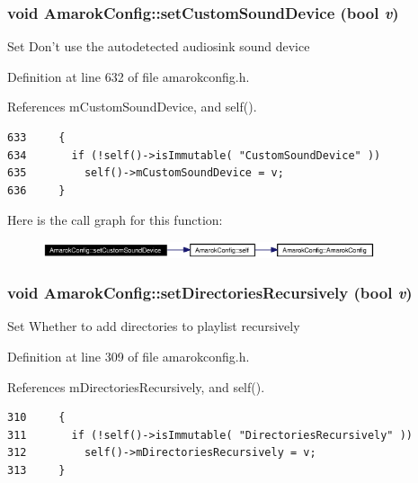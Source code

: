\subsubsection{\setlength{\rightskip}{0pt plus 5cm}void Amarok\-Config::set\-Custom\-Sound\-Device (bool {\em v})\hspace{0.3cm}{\tt  [inline, static]}}\label{classAmarokConfig_AmarokConfige65}


Set Don't use the autodetected audiosink sound device 

Definition at line 632 of file amarokconfig.h.

References m\-Custom\-Sound\-Device, and self().



\footnotesize\begin{verbatim}633     {
634       if (!self()->isImmutable( "CustomSoundDevice" ))
635         self()->mCustomSoundDevice = v;
636     }
\end{verbatim}\normalsize 


Here is the call graph for this function:\begin{figure}[H]
\begin{center}
\leavevmode
\includegraphics[width=277pt]{classAmarokConfig_AmarokConfige65_cgraph}
\end{center}
\end{figure}
\subsubsection{\setlength{\rightskip}{0pt plus 5cm}void Amarok\-Config::set\-Directories\-Recursively (bool {\em v})\hspace{0.3cm}{\tt  [inline, static]}}\label{classAmarokConfig_AmarokConfige31}


Set Whether to add directories to playlist recursively 

Definition at line 309 of file amarokconfig.h.

References m\-Directories\-Recursively, and self().



\footnotesize\begin{verbatim}310     {
311       if (!self()->isImmutable( "DirectoriesRecursively" ))
312         self()->mDirectoriesRecursively = v;
313     }
\end{verbatim}\normalsize 


